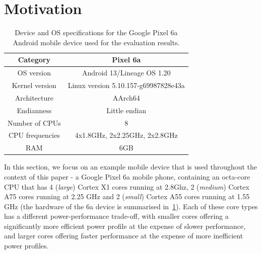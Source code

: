 \documentclass[conference]{IEEEtran}
\begin{document}
\section{Motivation}
\label{sec:motivation}

\begin{table}[ht]
\renewcommand{\arraystretch}{1.3}
\caption{Device and OS specifications for the Google Pixel 6a Android mobile device used for the evaluation results.}
\label{tab:devicespecs}
\centering
\begin{tabular}{|c|c|}
\hline 
\textbf{Category} & \textbf{Pixel 6a} \\ %
\hline
      OS version & Android 13/Lineage OS 1.20 \\
      Kernel version & Linux version 5.10.157-g69987828e43a \\
      Architecture & AArch64 \\
      Endianness & Little endian \\
      Number of CPUs & 8  \\
      CPU frequencies & 4x1.8GHz, 2x2.25GHz, 2x2.8GHz \\
      RAM & 6GB  \\
      \hline 
\end{tabular}
\end{table}

In this section, we focus on an example mobile device that is used throughout the context of this paper - a Google Pixel 6a mobile phone,  containing an octa-core CPU that has 4 (\emph{large}) Cortex X1 cores running at 2.8Ghz, 2 (\emph{medium}) Cortex A75 cores running at 2.25 GHz and 2 (\emph{small}) Cortex A55 cores running at 1.55 GHz (the hardware of the 6a  device is summarised in~\cref{tab:devicespecs}). Each of these core types has a different power-performance trade-off, with smaller cores offering a significantly more efficient power profile at the expense of slower performance, and larger cores offering faster performance at the expense of more inefficient power profiles.
\end{document}
